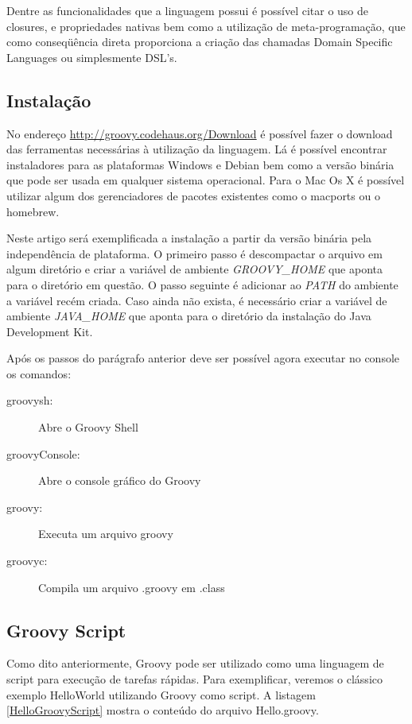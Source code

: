 \documentclass[12pt]{article}
\begin{document}
    Dentre as funcionalidades que a linguagem possui é possível citar o uso de 
    closures,  e propriedades nativas bem como a utilização de meta-programação, 
    que como conseqüência direta proporciona a criação das chamadas Domain 
    Specific Languages ou simplesmente DSL's.

\subsection{Instalação}
    
    No endereço \url{http://groovy.codehaus.org/Download} é possível fazer o 
    download das ferramentas necessárias à utilização da linguagem. Lá é possível
    encontrar instaladores para as plataformas Windows e Debian bem como a versão
    binária que pode ser usada em qualquer sistema operacional. Para o Mac Os X 
    é possível utilizar algum dos gerenciadores de pacotes existentes como o 
    macports ou o homebrew.
    
    Neste artigo será exemplificada a instalação a partir da versão binária pela 
    independência de plataforma. O primeiro passo é descompactar o arquivo em 
    algum diretório e criar a variável de ambiente \emph{GROOVY\_HOME} que aponta 
    para o diretório em questão. O passo seguinte é adicionar ao \emph{PATH} do 
    ambiente a variável recém criada. Caso ainda não exista, é necessário criar 
    a variável de ambiente \emph{JAVA\_HOME} que aponta para o diretório da 
    instalação do Java Development Kit.
    
    Após os passos do parágrafo anterior deve ser possível agora executar no 
    console os comandos:
    
    \begin{description}
        \item [groovysh:] Abre o Groovy Shell
        \item [groovyConsole:] Abre o console gráfico do Groovy 
        \item [groovy:] Executa um arquivo groovy
        \item [groovyc:] Compila um arquivo .groovy em .class
    \end{description}
    
\subsection{Groovy Script}
    
    Como dito anteriormente, Groovy pode ser utilizado como uma linguagem de 
    script para execução de tarefas rápidas. Para exemplificar, veremos o clássico
    exemplo HelloWorld utilizando Groovy como script. A listagem \ref{HelloGroovyScript}
    mostra o conteúdo do arquivo Hello.groovy. 
    
\end{document}
